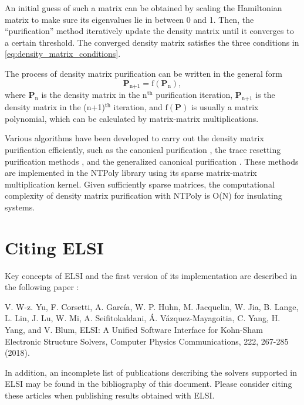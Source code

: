 \documentclass{report}
\begin{document}
An initial guess of such a matrix can be obtained by scaling the Hamiltonian matrix to make sure its eigenvalues lie in between 0 and 1.  Then, the ``purification'' method iteratively update the density matrix until it converges to a certain threshold.  The converged density matrix satisfies the three conditions in \ref{eq:density_matrix_conditions}.

The process of density matrix purification can be written in the general form
\begin{equation}
\label{eq:purification}
\boldsymbol{P}_\text{n+1} = \text{f}(\boldsymbol{P}_\text{n}) ,
\end{equation}
where $\boldsymbol{P}_\text{n}$ is the density matrix in the n$^\text{th}$ purification iteration, $\boldsymbol{P}_\text{n+1}$ is the density matrix in the (n+1)$^\text{th}$ iteration, and $\text{f}(\boldsymbol{P})$ is usually a matrix polynomial, which can be calculated by matrix-matrix multiplications.

Various algorithms have been developed to carry out the density matrix purification efficiently, such as the canonical purification \cite{purification_palser_1998}, the trace resetting purification methods \cite{purification_niklasson_2002}, and the generalized canonical purification \cite{purification_truflandier_2016}.  These methods are implemented in the NTPoly library \cite{ntpoly_dawson_2018} using its sparse matrix-matrix multiplication kernel.  Given sufficiently sparse matrices, the computational complexity of density matrix purification with NTPoly is O(N) for insulating systems.

\section{Citing ELSI}
\label{sec:cite}
Key concepts of ELSI and the first version of its implementation are described in the following paper \cite{elsi_yu_2018}:

V. W-z. Yu, F. Corsetti, A. Garc\'{i}a, W. P. Huhn, M. Jacquelin, W. Jia, B. Lange, L. Lin, J. Lu, W. Mi, A. Seifitokaldani, \'{A}. V\'{a}zquez-Mayagoitia, C. Yang, H. Yang, and V. Blum, ELSI: A Unified Software Interface for Kohn-Sham Electronic Structure Solvers, Computer Physics Communications, 222, 267-285 (2018).

In addition, an incomplete list of publications describing the solvers supported in ELSI may be found in the bibliography of this document.  Please consider citing these articles when publishing results obtained with ELSI.
\end{document}
